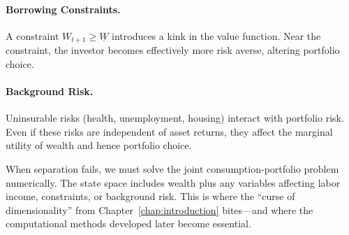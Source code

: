 \paragraph{Borrowing Constraints.}

A constraint $W_{t+1} \geq \underline{W}$ introduces a kink in the value function. Near the constraint, the investor becomes effectively more risk averse, altering portfolio choice.

\paragraph{Background Risk.}

Uninsurable risks (health, unemployment, housing) interact with portfolio risk. Even if these risks are independent of asset returns, they affect the marginal utility of wealth and hence portfolio choice.

\begin{calloutnote}
When separation fails, we must solve the joint consumption-portfolio problem numerically. The state space includes wealth plus any variables affecting labor income, constraints, or background risk. This is where the ``curse of dimensionality'' from Chapter~\ref{chap:introduction} bites---and where the computational methods developed later become essential.
\end{calloutnote}

